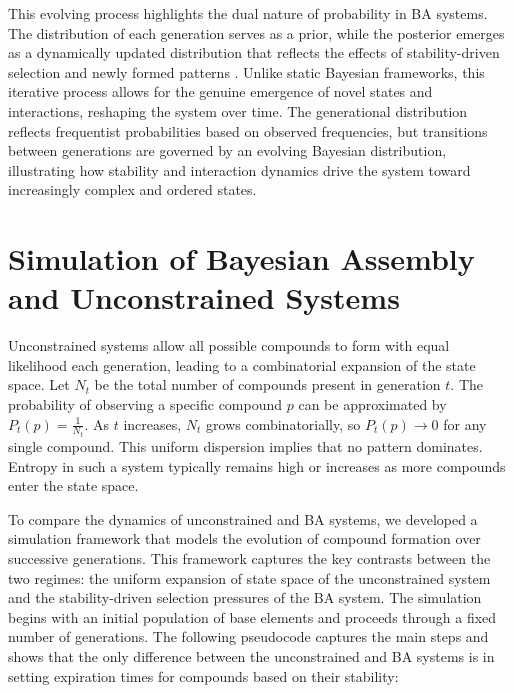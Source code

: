 \documentclass[entropy,article,submit,pdftex,moreauthors]{Definitions/mdpi}
\begin{document}
This evolving process highlights the dual nature of probability in BA systems. The distribution of each generation serves as a prior, while the posterior emerges as a dynamically updated distribution that reflects the effects of stability-driven selection and newly formed patterns \cite{le2020equation}. Unlike static Bayesian frameworks, this iterative process allows for the genuine emergence of novel states and interactions, reshaping the system over time. The generational distribution reflects frequentist probabilities based on observed frequencies, but transitions between generations are governed by an evolving Bayesian distribution, illustrating how stability and interaction dynamics drive the system toward increasingly complex and ordered states.

\section{Simulation of Bayesian Assembly and Unconstrained Systems}

Unconstrained systems allow all possible compounds to form with equal likelihood each generation, leading to a combinatorial expansion of the state space. Let $N_t$ be the total number of compounds present in generation $t$. The probability of observing a specific compound $p$ can be approximated by $P_t(p) = \frac{1}{N_t}$. As $t$ increases, $N_t$ grows combinatorially, so $P_t(p) \to 0$ for any single compound. This uniform dispersion implies that no pattern dominates. Entropy in such a system typically remains high or increases as more compounds enter the state space.

To compare the dynamics of unconstrained and BA systems, we developed a simulation framework that models the evolution of compound formation over successive generations. This framework captures the key contrasts between the two regimes: the uniform expansion of state space of the unconstrained system and the stability-driven selection pressures of the BA system. The simulation begins with an initial population of base elements and proceeds through a fixed number of generations. The following pseudocode captures the main steps and shows that the only difference between the unconstrained and BA systems is in setting expiration times for compounds based on their stability:
\end{document}
